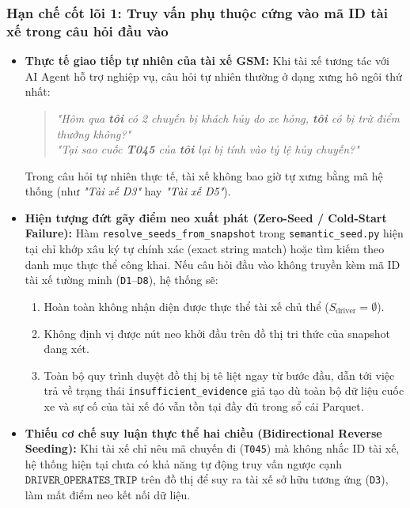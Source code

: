 \documentclass[a4paper,11pt]{article}
\begin{document}
\subsubsection{Hạn chế cốt lõi 1: Truy vấn phụ thuộc cứng vào mã ID tài xế trong câu hỏi đầu vào}
\label{sec:limitation-driver-id}
\begin{itemize}[leftmargin=1.5em]
    \item \textbf{Thực tế giao tiếp tự nhiên của tài xế GSM:} Khi tài xế tương tác với AI Agent hỗ trợ nghiệp vụ, câu hỏi tự nhiên thường ở dạng xưng hô ngôi thứ nhất:
    \begin{quote}
        \textit{"Hôm qua \textbf{tôi} có 2 chuyến bị khách hủy do xe hỏng, \textbf{tôi} có bị trừ điểm thưởng không?"}\\
        \textit{"Tại sao cuốc \textbf{T045} của \textbf{tôi} lại bị tính vào tỷ lệ hủy chuyến?"}
    \end{quote}
    Trong câu hỏi tự nhiên thực tế, tài xế không bao giờ tự xưng bằng mã hệ thống (như \textit{"Tài xế D3"} hay \textit{"Tài xế D5"}).
    \item \textbf{Hiện tượng đứt gãy điểm neo xuất phát (Zero-Seed / Cold-Start Failure):} Hàm \nolinkurl{resolve_seeds_from_snapshot} trong \nolinkurl{semantic_seed.py} hiện tại chỉ khớp xâu ký tự chính xác (exact string match) hoặc tìm kiếm theo danh mục thực thể công khai. Nếu câu hỏi đầu vào không truyền kèm mã ID tài xế tường minh (\texttt{D1}--\texttt{D8}), hệ thống sẽ:
    \begin{enumerate}[noitemsep]
        \item Hoàn toàn không nhận diện được thực thể tài xế chủ thể ($S_{\text{driver}} = \emptyset$).
        \item Không định vị được nút neo khởi đầu trên đồ thị tri thức của snapshot đang xét.
        \item Toàn bộ quy trình duyệt đồ thị bị tê liệt ngay từ bước đầu, dẫn tới việc trả về trạng thái \nolinkurl{insufficient_evidence} giả tạo dù toàn bộ dữ liệu cuốc xe và sự cố của tài xế đó vẫn tồn tại đầy đủ trong sổ cái Parquet.
    \end{enumerate}
    \item \textbf{Thiếu cơ chế suy luận thực thể hai chiều (Bidirectional Reverse Seeding):} Khi tài xế chỉ nêu mã chuyến đi (\texttt{T045}) mà không nhắc ID tài xế, hệ thống hiện tại chưa có khả năng tự động truy vấn ngược cạnh $\texttt{DRIVER\_OPERATES\_TRIP}$ trên đồ thị để suy ra tài xế sở hữu tương ứng (\texttt{D3}), làm mất điểm neo kết nối dữ liệu.
\end{itemize}
\end{document}
